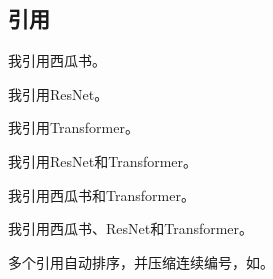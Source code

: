 \subsection{引用}

我引用西瓜书\cite{西瓜书}。

我引用ResNet\cite{ResNet}。

我引用Transformer\cite{Transformer}。

我引用ResNet和Transformer\cite{ResNet, Transformer}。

我引用西瓜书和Transformer\cite{西瓜书, Transformer}。

我引用西瓜书、ResNet和Transformer\cite{西瓜书, ResNet, Transformer}。

多个引用自动排序，并压缩连续编号，如\cite{BatchNormalization, Transformer, 西瓜书, ResNet}。
